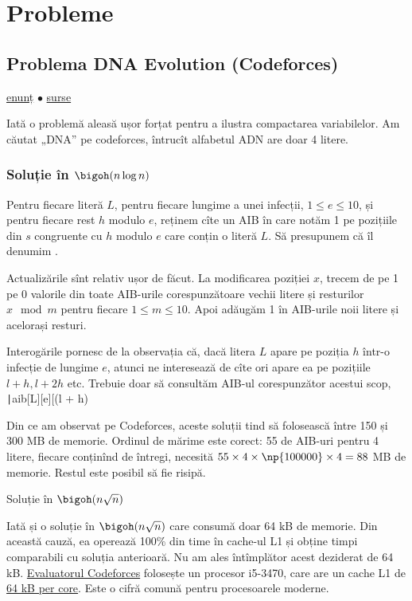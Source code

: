 \section{Probleme}

\subsection{Problema DNA Evolution (Codeforces)}
\label{problem:dna-evolution}

\href{https://codeforces.com/contest/827/problem/C}{enunț}
$\bullet$
\hyperref[code:dna-evolution]{surse}

Iată o problemă aleasă ușor forțat pentru a ilustra compactarea variabilelor. Am căutat „DNA” pe codeforces, întrucît alfabetul ADN are doar 4 litere. 

\subsubsection*{Soluție în $\bigoh(n \log n)$}

Pentru fiecare literă $L$, pentru fiecare lungime a unei infecții, $1 \leq e \leq 10$, și pentru fiecare rest $h$ modulo $e$, reținem cîte un AIB în care notăm 1 pe pozițiile din $s$ congruente cu $h$ modulo $e$ care conțin o literă $L$. Să presupunem că îl denumim .

Actualizările sînt relativ ușor de făcut. La modificarea poziției $x$, trecem de pe 1 pe 0 valorile din toate AIB-urile corespunzătoare vechii litere și resturilor $x \mod m$ pentru fiecare $1 \leq m \leq 10$. Apoi adăugăm 1 în AIB-urile noii litere și acelorași resturi.

Interogările pornesc de la observația că, dacă litera $L$ apare pe poziția $h$ într-o infecție de lungime $e$, atunci ne interesează de cîte ori apare ea pe pozițiile $l + h, l + 2h$ etc. Trebuie doar să consultăm AIB-ul corespunzător acestui scop, \texttt|aib[L][e][(l + h) %

Din ce am observat pe Codeforces, aceste soluții tind să folosească între 150 și 300 MB de memorie. Ordinul de mărime este corect: 55 de AIB-uri pentru 4 litere, fiecare conținînd  de întregi, necesită $55 \times 4 \times \np{100000} \times 4 = 88$ MB de memorie. Restul este posibil să fie risipă.

Soluție în $\bigoh(n \sqrt{n})$

Iată și o soluție în $\bigoh(n \sqrt{n})$ care consumă doar 64 kB de memorie. Din această cauză, ea operează 100\% din time în cache-ul L1 și obține timpi comparabili cu soluția anterioară. Nu am ales întîmplător acest deziderat de 64 kB. \href{https://codeforces.com/blog/entry/57248}{Evaluatorul Codeforces} folosește un procesor i5-3470, care are un cache L1 de \href{https://www.techpowerup.com/cpu-specs/core-i5-3470.c1039}{64 kB per core}. Este o cifră comună pentru procesoarele moderne.

